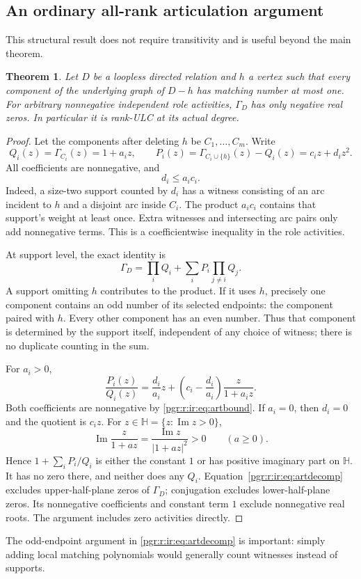 \documentclass[11pt]{article}
\numberwithin{equation}{section}
\newtheorem{theorem}{Theorem}[section]\newtheorem{lemma}[theorem]{Lemma}\newtheorem{proposition}[theorem]{Proposition}\newtheorem{corollary}[theorem]{Corollary}
\theoremstyle{definition}\newtheorem{definition}[theorem]{Definition}\newtheorem{remark}[theorem]{Remark}
\newcommand{\Ga}{\Gamma}                   %
\newcommand{\HH}{\mathbb H}                %
\begin{document}
\subsection{An ordinary all-rank articulation argument}\label{pgr:r:ir:sec:articulation}
This structural result does not require transitivity and is useful beyond the main theorem.
\begin{theorem}\label{pgr:r:ir:thm:articulation}
Let $D$ be a loopless directed relation and $h$ a vertex such that every component of the underlying graph of $D-h$ has matching number at most one. For arbitrary nonnegative independent role activities, $\Ga_D$ has only negative real zeros. In particular it is rank-ULC at its actual degree.
\end{theorem}
\begin{proof}
Let the components after deleting $h$ be $C_1,\ldots,C_m$. Write
\[
 Q_i(z)=\Ga_{C_i}(z)=1+a_i z,
 \qquad
 P_i(z)=\Ga_{C_i\cup\{h\}}(z)-Q_i(z)=c_i z+d_i z^2.
\]
All coefficients are nonnegative, and
\begin{equation}\label{pgr:r:ir:eq:artbound}
 d_i\le a_i c_i.
\end{equation}
Indeed, a size-two support counted by $d_i$ has a witness consisting of an arc incident to $h$ and a disjoint arc inside $C_i$. The product $a_i c_i$ contains that support's weight at least once. Extra witnesses and intersecting arc pairs only add nonnegative terms. This is a coefficientwise inequality in the role activities.

At support level, the exact identity is
\begin{equation}\label{pgr:r:ir:eq:artdecomp}
 \Ga_D=\prod_i Q_i+\sum_i P_i\prod_{j\ne i}Q_j.
\end{equation}
A support omitting $h$ contributes to the product. If it uses $h$, precisely one component contains an odd number of its selected endpoints: the component paired with $h$. Every other component has an even number. Thus that component is determined by the support itself, independent of any choice of witness; there is no duplicate counting in the sum.

For $a_i>0$,
\begin{equation}\label{pgr:r:ir:eq:pickart}
 \frac{P_i(z)}{Q_i(z)}=\frac{d_i}{a_i}z+\left(c_i-\frac{d_i}{a_i}\right)\frac{z}{1+a_i z}.
\end{equation}
Both coefficients are nonnegative by \eqref{pgr:r:ir:eq:artbound}. If $a_i=0$, then $d_i=0$ and the quotient is $c_i z$. For $z\in\HH=\{z:\operatorname{Im}z>0\}$,
\[
 \operatorname{Im}\frac{z}{1+a z}=\frac{\operatorname{Im}z}{|1+a z|^2}>0\qquad(a\ge0).
\]
Hence $1+\sum_iP_i/Q_i$ is either the constant $1$ or has positive imaginary part on $\HH$. It has no zero there, and neither does any $Q_i$. Equation~\eqref{pgr:r:ir:eq:artdecomp} excludes upper-half-plane zeros of $\Ga_D$; conjugation excludes lower-half-plane zeros. Its nonnegative coefficients and constant term $1$ exclude nonnegative real roots. The argument includes zero activities directly.
\end{proof}
The odd-endpoint argument in \eqref{pgr:r:ir:eq:artdecomp} is important: simply adding local matching polynomials would generally count witnesses instead of supports.
\end{document}
